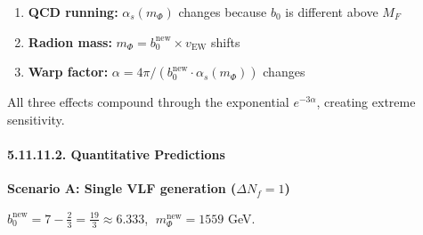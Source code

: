 \documentclass[
  11pt,
]{article}
\providecommand{\tightlist}{%
  \setlength{\itemsep}{0pt}\setlength{\parskip}{0pt}}
\begin{document}
\begin{enumerate}
\def\labelenumi{\arabic{enumi}.}
\tightlist
\item
  \textbf{QCD running:} \(\alpha_s(m_\Phi)\) changes because \(b_0\) is
  different above \(M_F\)
\item
  \textbf{Radion mass:}
  \(m_\Phi = b_0^{\text{new}} \times v_{\text{EW}}\) shifts
\item
  \textbf{Warp factor:}
  \(\alpha = 4\pi / (b_0^{\text{new}} \cdot \alpha_s(m_\Phi))\) changes
\end{enumerate}

All three effects compound through the exponential \(e^{-3\alpha}\),
creating extreme sensitivity.

\hypertarget{quantitative-predictions}{%
\paragraph{5.11.11.2. Quantitative
Predictions}\label{quantitative-predictions}}

\textbf{Scenario A: Single VLF generation (\(\Delta N_f = 1\))}

\(b_0^{\text{new}} = 7 - \tfrac{2}{3} = \tfrac{19}{3} \approx 6.333\),
\(\;m_\Phi^{\text{new}} = 1559\) GeV.
\end{document}

